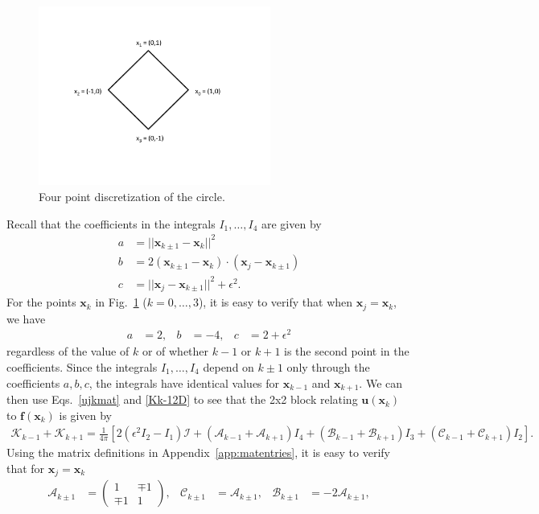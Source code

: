 \documentclass[12pt]{article}
\newcommand{\bx}{\mathbf{x}}
\newcommand{\bu}{\mathbf{u}}
\newcommand{\ff}{\mathbf{f}}
\newcommand{\eps}{\epsilon}
\newcommand{\baas}[1]{\begin{align*} #1 \end{align*}}
\begin{document}
\begin{figure}
	\centering
	\includegraphics[width=3.0in]{testcase2D.pdf}
	\caption{\small{Four point discretization of the circle.}}\label{fig:testcase2D}
\end{figure}
Recall that the coefficients in the integrals $I_1,\dotsc,I_4$ are given by
\baas{
a & = || \bx_{k\pm 1} - \bx_k ||^2 \\
b & =  2(\bx_{k\pm 1} - \bx_k ) \cdot (\bx_j - \bx_{k\pm 1} ) \\
c & = || \bx_j - \bx_{k\pm 1}||^2 + \eps^2.
}
For the points $\bx_k$ in Fig.~\ref{fig:testcase2D} ($k=0,\dotsc,3$), it is easy to verify that when $\bx_j = \bx_k$, we have
\baas{
a & = 2, & b & =  -4, & c & = 2 + \eps^2
}
regardless of the value of $k$ or of whether $k-1$ or $k+1$ is the second point in the coefficients. Since the integrals $I_1,\dotsc,I_4$ depend on $k\pm 1$ only through the coefficients $a,b,c$, the integrals have identical values for $\bx_{k-1}$ and $\bx_{k+1}$. We can then use Eqs.~\eqref{ujkmat} and \eqref{Kk-12D} to see that the 2x2 block relating $\bu(\bx_k)$ to $\ff(\bx_k)$ is given by
\baas{
\mathcal{K}_{k-1} + \mathcal{K}_{k+1} = \frac{1}{4\pi}\left[2\left(\eps^2 I_2 - I_1\right)\mathcal{I} + \left(\mathcal{A}_{k-1}+\mathcal{A}_{k+1}\right) I_4 + \left(\mathcal{B}_{k-1}+\mathcal{B}_{k+1}\right) I_3 + \left(\mathcal{C}_{k-1}+\mathcal{C}_{k+1}\right) I_2\right].
}
Using the matrix definitions in Appendix~\ref{app:matentries}, it is easy to verify that for $\bx_j = \bx_k$
\baas{
\mathcal{A}_{k\pm 1} & = \begin{pmatrix} 1 & \mp 1 \\ \mp 1 & 1 \end{pmatrix}, & \mathcal{C}_{k\pm 1} & = \mathcal{A}_{k\pm 1}, & \mathcal{B}_{k\pm 1} & = -2\mathcal{A}_{k\pm 1},
}
\end{document}
